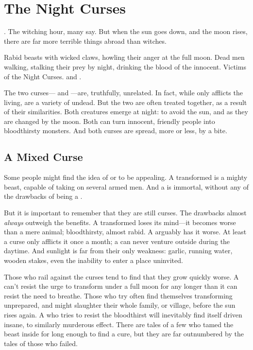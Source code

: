 \chapter{The Night Curses}

.
The witching hour, many say.
But when the sun goes down, and the moon rises, there are far more terrible things abroad than witches.

Rabid beasts with wicked claws, howling their anger at the full moon.
Dead men walking, stalking their prey by night, drinking the blood of the innocent.
Victims of the Night Curses.
\capital{\werewolves} and {\vampires}.

The two curses---{\lycanthropy} and {\vampirism}---are, truthfully, unrelated.
In fact, while {\lycanthropy} only afflicts the living, {\vampires} are a variety of undead.
But the two are often treated together, as a result of their similarities.
Both creatures emerge at night: {\vampires} to avoid the sun, and {\werewolves} as they are changed by the moon.
Both can turn innocent, friendly people into bloodthirsty monsters.
And both curses are spread, more or less, by a bite.

\section{A Mixed Curse}

Some people might find the idea of {\lycanthropy} or {\vampirism} to be appealing.
A transformed {\werewolf} is a mighty beast, capable of taking on several armed men.
And a {\vampire} is immortal, without any of the drawbacks of being a .

But it is important to remember that they are still curses.
The drawbacks almost \emph{always} outweigh the benefits.
A transformed {\werewolf} loses its mind---it becomes worse than a mere animal; bloodthirsty, almost rabid.
A {\vampire} arguably has it worse.
At least a {\werewolfpossessive} curse only afflicts it once a month; a {\vampire} can never venture outside during the daytime.
And sunlight is far from their only weakness: garlic, running water, wooden stakes, even the inability to enter a place uninvited.

Those who rail against the curses tend to find that they grow quickly worse.
A {\werewolf} can't resist the urge to transform under a full moon for any longer than it can resist the need to breathe.
Those who try often find themselves transforming unprepared, and might slaughter their whole family, or village, before the sun rises again.
A {\vampire} who tries to resist the bloodthirst will inevitably find itself driven insane, to similarly murderous effect.
There are tales of a few who tamed the beast inside for long enough to find a cure, but they are far outnumbered by the tales of those who failed.

